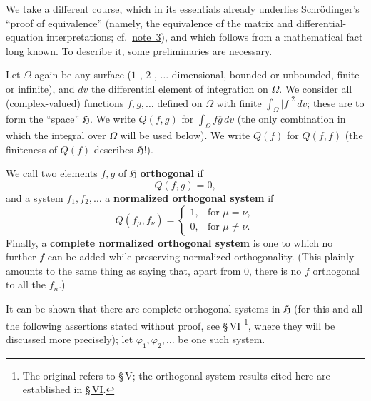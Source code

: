 \documentclass[fontsize=13pt,paper=b5,twoside,bookmarkpackage=false]{scrartcl}
\newcommand{\Sec}[1]{\hyperref[sec:#1]{\S\,#1}}
\newcommand{\fnref}[1]{\hyperref[fn:#1]{note~#1}}
\newcounter{translatornote}
\newcommand{\tnote}[1]{%
  \begingroup\stepcounter{translatornote}%
  \renewcommand{\thefootnote}{T\arabic{translatornote}}%
  \footnote[0]{#1}\endgroup}
\begin{document}
We take a different course, which in its essentials already underlies Schr\"o\-din\-ger's ``proof of equivalence'' (namely, the equivalence of the matrix and differential-equation interpretations; cf.\ \fnref{3}), and which follows from a mathematical fact long known. To describe it, some preliminaries are necessary.

Let $\Omega$ again be any surface ($1$-, $2$-, $\ldots$-dimensional, bounded or unbounded, finite or infinite), and $dv$ the differential element of integration on $\Omega$. We consider all (complex-valued) functions $f,g,\ldots$ defined on $\Omega$ with finite $\int_\Omega|f|^2\,dv$; these are to form the ``space'' $\mathfrak{H}$. We write $Q(f,g)$ for $\int_\Omega f\overline{g}\,dv$ (the only combination in which the integral over $\Omega$ will be used below). We write $Q(f)$ for $Q(f,f)$ (the finiteness of $Q(f)$ describes $\mathfrak{H}$!).

We call two elements $f,g$ of $\mathfrak{H}$ \textbf{orthogonal} if
\[
Q(f,g)=0,
\]
and a system $f_1,f_2,\ldots$ a \textbf{normalized orthogonal system} if
\[
Q(f_\mu,f_\nu)=
\begin{cases}
1,&\text{for }\mu=\nu,\\
0,&\text{for }\mu\ne\nu.
\end{cases}
\]
Finally, a \textbf{complete normalized orthogonal system} is one to which no further $f$ can be added while preserving normalized orthogonality. (This plainly amounts to the same thing as saying that, apart from $0$, there is no $f$ orthogonal to all the $f_n$.)

It can be shown that there are complete orthogonal systems in $\mathfrak{H}$ (for this and all the following assertions stated without proof, see \Sec{VI}\tnote{The original refers to \S\,V; the orthogonal-system results cited here are established in \Sec{VI}.}, where they will be discussed more precisely); let $\varphi_1,\varphi_2,\ldots$ be one such system.
\end{document}
